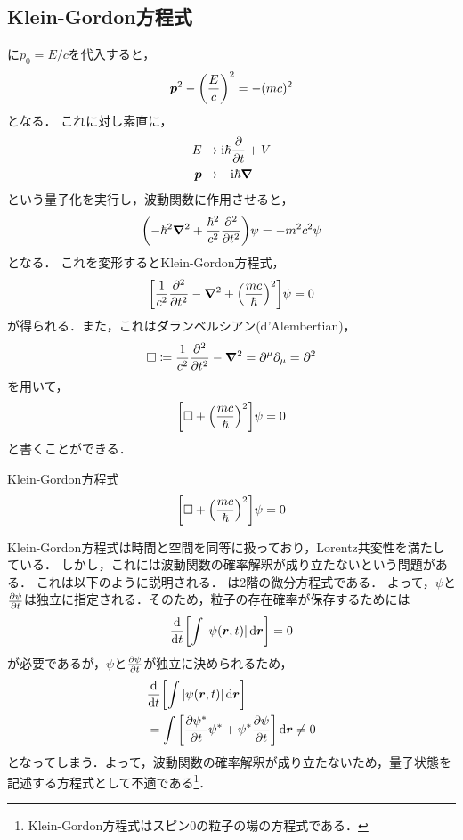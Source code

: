 \documentclass{report}
\begin{document}
  \subsection{Klein-Gordon方程式}
    に$p_0 = E/c$を代入すると，
    \begin{align}
      \bm{p}^2 - \qty(\frac{E}{c})^2 = -(mc)^2
    \end{align}
    となる．
    これに対し素直に，
    \begin{align}
      E &\to \mathrm{i}\hbar\pdv{t} + V \\ 
      \bm{p} &\to - \mathrm{i}\hbar\grad 
    \end{align}
    という量子化を実行し，波動関数に作用させると，
    \begin{align}
      \qty(-\hbar^2\grad^2 + \frac{\hbar^2}{c^2}\pdv[2]{t})\psi = -m^2c^2\psi
    \end{align}
    となる．
    これを変形するとKlein-Gordon方程式，
    \begin{align}
      \qty[\frac{1}{c^2}\pdv[2]{t} - \grad^2 + \qty(\frac{mc}{\hbar})^2]\psi = 0 
    \end{align}
    が得られる．また，これはダランベルシアン(d'Alembertian)，
    \begin{align}
      \Box \coloneqq \frac{1}{c^2}\pdv[2]{t} - \grad^2 = \partial^\mu\partial_\mu = \partial^2
    \end{align}
    を用いて，
    \begin{align}
      \qty[\Box + \qty(\frac{mc}{\hbar})^2]\psi = 0
    \end{align}
    と書くことができる．
    \begin{itembox}[l]{Klein-Gordon方程式}
      \begin{align}
        \qty[\Box + \qty(\frac{mc}{\hbar})^2]\psi = 0 \label{Klein-Gordon-equation}
      \end{align}
    \end{itembox}
    \par
    Klein-Gordon方程式は時間と空間を同等に扱っており，Lorentz共変性を満たしている．
    しかし，これには波動関数の確率解釈が成り立たないという問題がある．
    これは以下のように説明される．
    は2階の微分方程式である．
    よって，$\psi$と$\pdv{\psi}{t}$は独立に指定される．そのため，粒子の存在確率が保存するためには
    \begin{align}
      \dv{t}\qty[\int \abs{\psi(\bm{r}, t)} \dd{\bm{r}}] = 0
    \end{align}
    が必要であるが，$\psi$と$\pdv{\psi}{t}$が独立に決められるため，
    \begin{align}
      &\dv{t}\qty[\int \abs{\psi(\bm{r}, t)} \dd{\bm{r}}]\\
      &= \int \qty[\pdv{\psi^*}{t}\psi^{*} + \psi^*\pdv{\psi}{t}] \dd{\bm{r}} \neq 0
    \end{align}
    となってしまう．よって，波動関数の確率解釈が成り立たないため，量子状態を記述する方程式として不適である\footnote{Klein-Gordon方程式はスピン0の粒子の場の方程式である．}．
\end{document}
